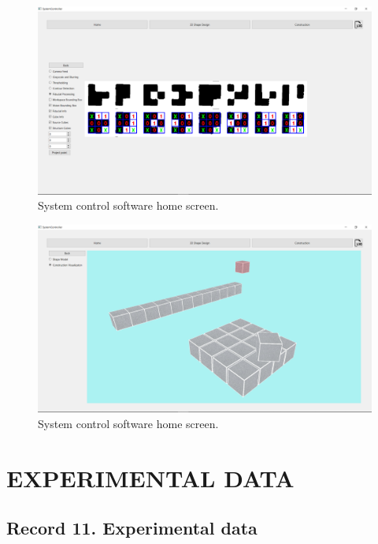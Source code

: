 \begin{figure}[!ht]
	\centering
	\includegraphics[width=1\linewidth]{figures/gui-vision-view-fiducial.png}
	\caption{System control software home screen.}
	\label{fig:gui-vision-view-fiducial}
\end{figure}

\begin{figure}[!ht]
	\centering
	\includegraphics[width=1\linewidth]{figures/gui-model-view.png}
	\caption{System control software home screen.}
	\label{fig:gui-vision-view-model}
\end{figure}

\newpage


\section{EXPERIMENTAL DATA}

\subsection{Record 11. Experimental data}

